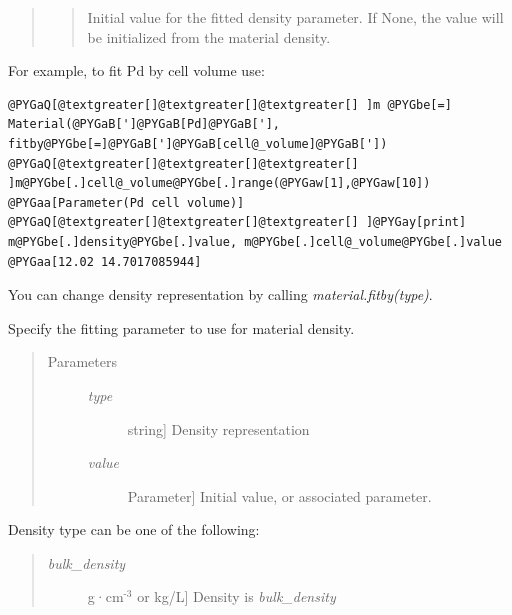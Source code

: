 \documentclass[letterpaper,10pt,english]{sphinxmanual}
\begin{document}
\begin{fulllineitems}
\begin{quote}
\begin{description}
\begin{quote}
Initial value for the fitted density parameter.  If None, the
value will be initialized from the material density.
\end{quote}

\end{description}\end{quote}

For example, to fit Pd by cell volume use:

\begin{Verbatim}[commandchars=@\[\]]
@PYGaQ[@textgreater[]@textgreater[]@textgreater[] ]m @PYGbe[=] Material(@PYGaB[']@PYGaB[Pd]@PYGaB['], fitby@PYGbe[=]@PYGaB[']@PYGaB[cell@_volume]@PYGaB['])
@PYGaQ[@textgreater[]@textgreater[]@textgreater[] ]m@PYGbe[.]cell@_volume@PYGbe[.]range(@PYGaw[1],@PYGaw[10])
@PYGaa[Parameter(Pd cell volume)]
@PYGaQ[@textgreater[]@textgreater[]@textgreater[] ]@PYGay[print] m@PYGbe[.]density@PYGbe[.]value, m@PYGbe[.]cell@_volume@PYGbe[.]value
@PYGaa[12.02 14.7017085944]
\end{Verbatim}

You can change density representation by calling \emph{material.fitby(type)}.

\begin{fulllineitems}
\label{api/material:refl1d.material.Material.fitby}
Specify the fitting parameter to use for material density.
\begin{quote}\begin{description}
\item[{Parameters }] \leavevmode\begin{description}
\item[{\emph{type}}] \leavevmode{[}string{]}
Density representation

\item[{\emph{value}}] \leavevmode{[}Parameter{]}
Initial value, or associated parameter.

\end{description}

\end{description}\end{quote}

Density type can be one of the following:
\begin{quote}
\begin{description}
\item[{\emph{bulk\_density}}] \leavevmode{[}g·cm$^{\text{-3}}$ or kg/L{]}
Density is \emph{bulk\_density}


\end{description}
\end{quote}
\end{fulllineitems}
\end{fulllineitems}
\end{document}
